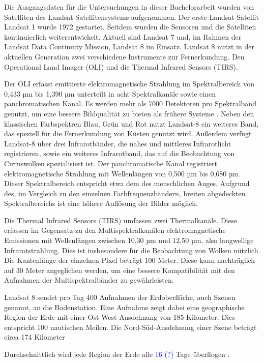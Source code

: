 Die Ausgangsdaten für die Untersuchungen in dieser Bachelorarbeit wurden von Satelliten des Landsat-Satellitensystems aufgenommen. Der erste Landsat-Satellit Landsat 1 wurde 1972 gestartet. Seitdem wurden die Sensoren und die Satelliten kontinuierlich weiterentwickelt. Aktuell sind Landsat 7 und, im Rahmen der Landsat Data Continuity Mission, Landsat 8 im Einsatz. Landsat 8 nutzt in der aktuellen Generation zwei verschiedene Instrumente zur Fernerkundung. Den Operational Land Imager (OLI) und die Thermal Infrared Sensors (TIRS). 

Der OLI erfasst emittierte elektromagnetische Strahlung im Spektralbereich von 0,433 µm bis 1,390 µm unterteilt in acht Spektralkanäle sowie einen panchromatischen Kanal. Es werden mehr als 7000 Detektoren pro Spektralband genutzt, um eine bessere Bildqualität zu bieten als frühere Systeme \cite{Markham2004}. Neben den klassischen Farbspektren Blau, Grün und Rot nutzt Landsat-8 ein weiteres Band, das speziell für die Fernerkundung von Küsten genutzt wird. Außerdem verfügt Landsat-8 über drei Infrarotbänder, die nahes und mittleres Infrarotlicht registrieren, sowie ein weiteres Infrarotband, das auf die Beobachtung von Cirruswolken spezialisiert ist. Der panchromatische Kanal registriert elektromagnetische Strahlung mit Wellenlängen von 0,500 µm bis 0,680 µm. Dieser Spektralbereich entspricht etwa dem des menschlichen Auges. Aufgrund des, im Vergleich zu den einzelnen Farbfrequenzbändern, breiten abgedeckten Spektralbereichs ist eine höhere Auflösung der Bilder möglich.

Die Thermal Infrared Sensors (TIRS) \cite{Chaudhary2011} umfassen zwei Thermalkanäle. Diese erfassen im Gegensatz zu den Multispektralkanälen elektromagnetische Emissionen mit Wellenlängen zwischen 10,30 µm und 12,50 µm, also langwellige Infrarotstrahlung. Dies ist insbesondere für die Beobachtung von Wolken nützlich. Die Kantenlänge der einzelnen Pixel beträgt 100 Meter. Diese kann nachträglich auf 30 Meter angeglichen werden, um eine bessere Kompatibilität mit den Aufnahmen der Multispektralbänder zu gewährleisten.

Landsat 8 sendet pro Tag 400 Aufnahmen der Erdoberfläche, auch Szenen genannt, an die Bodenstation. Eine Aufnahme zeigt dabei eine geographische Region der Erde mit einer Ost-West-Ausdehnung von 185 Kilometer. Dies entspricht 100 nautischen Meilen. Die Nord-Süd-Ausdehnung einer Szene beträgt circa 174 Kilometer 

Durchschnittlich wird jede Region der Erde alle \textcolor{blue}{16 (?)} Tage überflogen \cite{Irons2012}.

